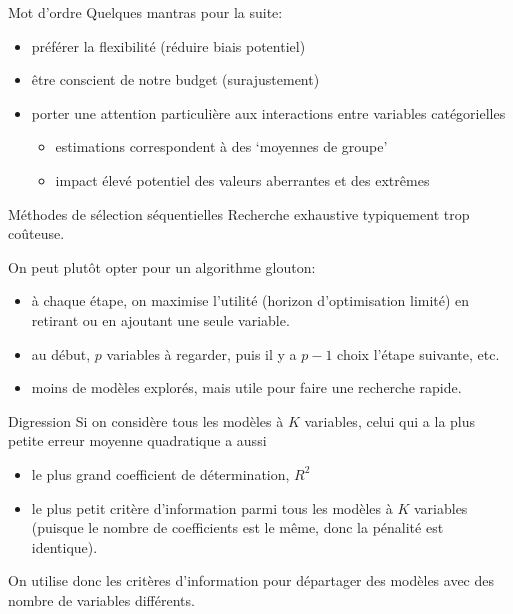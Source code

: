 \documentclass[
  ignorenonframetext,
]{beamer}
\providecommand{\tightlist}{%
  \setlength{\itemsep}{0pt}\setlength{\parskip}{0pt}}\usepackage{longtable,booktabs,array}
\begin{document}
\begin{frame}{Mot d'ordre}
\protect\hypertarget{mot-dordre}{}
Quelques mantras pour la suite:

\begin{itemize}
\tightlist
\item
  préférer la flexibilité (réduire biais potentiel)
\item
  être conscient de notre budget (surajustement)
\item
  porter une attention particulière aux interactions entre variables
  catégorielles

  \begin{itemize}
  \tightlist
  \item
    estimations correspondent à des `moyennes de groupe'
  \item
    impact élevé potentiel des valeurs aberrantes et des extrêmes
  \end{itemize}
\end{itemize}
\end{frame}

\begin{frame}{Méthodes de sélection séquentielles}
\protect\hypertarget{muxe9thodes-de-suxe9lection-suxe9quentielles}{}
Recherche exhaustive typiquement trop coûteuse.

On peut plutôt opter pour un algorithme glouton:

\begin{itemize}
\tightlist
\item
  à chaque étape, on maximise l'utilité (horizon d'optimisation limité)
  en retirant ou en ajoutant une seule variable.
\item
  au début, \(p\) variables à regarder, puis il y a \(p-1\) choix
  l'étape suivante, etc.
\item
  moins de modèles explorés, mais utile pour faire une recherche rapide.
\end{itemize}
\end{frame}

\begin{frame}{Digression}
\protect\hypertarget{digression}{}
Si on considère tous les modèles à \(K\) variables, celui qui a la plus
petite erreur moyenne quadratique a aussi

\begin{itemize}
\tightlist
\item
  le plus grand coefficient de détermination, \(R^2\)
\item
  le plus petit critère d'information parmi tous les modèles à \(K\)
  variables (puisque le nombre de coefficients est le même, donc la
  pénalité est identique).
\end{itemize}

On utilise donc les critères d'information pour départager des modèles
avec des nombre de variables différents.
\end{frame}
\end{document}
